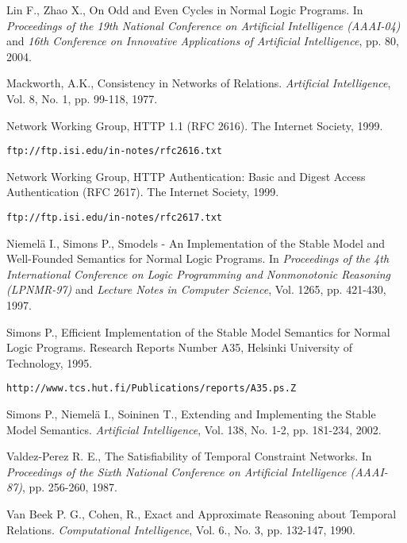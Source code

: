\documentclass[11pt]{report}
\begin{document}
\begin{thebibliography}{M}
      Lin F., Zhao X.,
      On Odd and Even Cycles in Normal Logic Programs.
      In {\em Proceedings of the 19th National Conference on Artificial Intelligence (AAAI-04)}
      and {\em 16th Conference on Innovative Applications of Artificial Intelligence},
      pp. 80,
      2004.

      Mackworth, A.K.,
      Consistency in Networks of Relations.
      {\em Artificial Intelligence},
      Vol. 8, No. 1, pp. 99-118,
      1977.

      Network Working Group,
      HTTP 1.1 (RFC 2616).
      The Internet Society, 1999.

      {\tt ftp://ftp.isi.edu/in-notes/rfc2616.txt}

      Network Working Group,
      HTTP Authentication: Basic and Digest Access Authentication (RFC 2617).
      The Internet Society, 1999.

      {\tt ftp://ftp.isi.edu/in-notes/rfc2617.txt}

      Niemel{\"a} I., Simons P.,
      Smodels - An Implementation of the Stable Model and Well-Founded
      Semantics for Normal Logic Programs.
      In {\em Proceedings of the 4th International Conference on Logic Programming and Nonmonotonic Reasoning (LPNMR-97)}
      and {\em Lecture Notes in Computer Science},
      Vol. 1265, pp. 421-430,
      1997.

      Simons P.,
      Efficient Implementation of the Stable Model Semantics for Normal Logic
      Programs.
      Research Reports Number A35, Helsinki University of Technology,
      1995.

      {\tt http://www.tcs.hut.fi/Publications/reports/A35.ps.Z}

      Simons P., Niemel{\"a} I., Soininen T.,
      Extending and Implementing the Stable Model Semantics.
      {\em Artificial Intelligence},
      Vol. 138, No. 1-2, pp. 181-234,
      2002.

      Valdez-Perez R. E.,
      The Satisfiability of Temporal Constraint Networks.
      In {\em Proceedings of the Sixth National Conference on Artificial Intelligence (AAAI-87)},
      pp. 256-260,
      1987.

      Van Beek P. G., Cohen, R.,
      Exact and Approximate Reasoning about Temporal Relations.
      {\em Computational Intelligence},
      Vol. 6., No. 3, pp. 132-147,
      1990.


\end{thebibliography}
\end{document}
